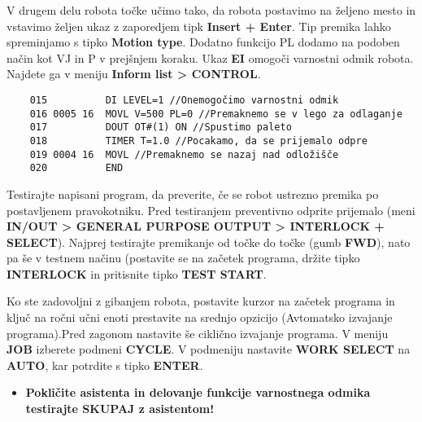 \vspace{5mm}

V drugem delu robota točke učimo tako, da robota postavimo na željeno mesto in vstavimo željen ukaz z zaporedjem tipk \textbf{Insert + Enter}. Tip premika lahko spreminjamo s tipko \textbf{Motion type}. Dodatno funkcijo PL dodamo na podoben način kot VJ in P v prejšnjem koraku. Ukaz \textbf{EI} omogoči varnostni odmik robota. Najdete ga v meniju \textbf{Inform list > CONTROL}.


\vspace{5mm}

\begin{mdframed}[backgroundcolor=gray!20, shadow=true,roundcorner=8pt]
	\begin{verbatim}
	015          DI LEVEL=1 //Onemogočimo varnostni odmik
	016 0005 16  MOVL V=500 PL=0 //Premaknemo se v lego za odlaganje
	017          DOUT OT#(1) ON //Spustimo paleto
	018          TIMER T=1.0 //Pocakamo, da se prijemalo odpre
	019 0004 16  MOVL //Premaknemo se nazaj nad odložišče
	020          END
\end{verbatim}
\end{mdframed}

\vspace{5mm}

Testirajte napisani program, da preverite, če se robot ustrezno premika po postavljenem pravokotniku. Pred testiranjem preventivno odprite prijemalo (meni \textbf{IN/OUT > GENERAL PURPOSE OUTPUT > INTERLOCK + SELECT}). Najprej testirajte premikanje od točke do točke (gumb \textbf{FWD}), nato pa še v testnem načinu (postavite se na začetek programa, držite tipko \textbf{INTERLOCK} in pritisnite tipko \textbf{TEST START}. %

Ko ste zadovoljni z gibanjem robota, postavite kurzor na začetek programa in ključ na ročni učni enoti prestavite na srednjo opzicijo (Avtomatsko izvajanje programa).Pred zagonom nastavite še ciklično izvajanje programa. V meniju \textbf{JOB} izberete podmeni \textbf{CYCLE}. V podmeniju nastavite \textbf{WORK SELECT} na \textbf{AUTO}, kar potrdite s tipko \textbf{ENTER}.

\vspace{5mm}

\begin{mdframed}[backgroundcolor=red!20, shadow=true,roundcorner=8pt]
	\begin{itemize}
		\item \textbf{Pokličite asistenta in delovanje funkcije varnostnega odmika testirajte SKUPAJ z asistentom!}		
	\end{itemize}
\end{mdframed}


